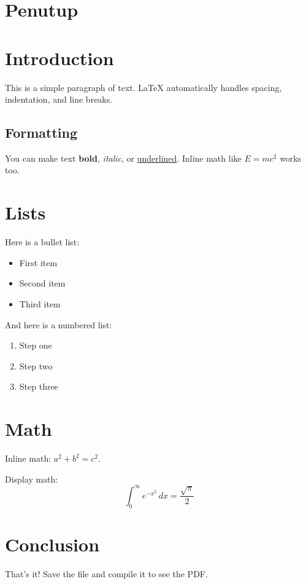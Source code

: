 \documentclass[12pt,a4paper]{report}
\begin{document}
\chapter{Penutup}


\chapter{Introduction}
This is a simple paragraph of text. LaTeX automatically handles spacing, indentation, and line breaks.

\section{Formatting}
You can make text \textbf{bold}, \textit{italic}, or \underline{underlined}. Inline math like $E = mc^2$ works too.

\chapter{Lists}
Here is a bullet list:
\begin{itemize}
  \item First item
  \item Second item
  \item Third item
\end{itemize}

And here is a numbered list:
\begin{enumerate}
  \item Step one
  \item Step two
  \item Step three
\end{enumerate}

\chapter{Math}
Inline math: $a^2 + b^2 = c^2$.

Display math:
\begin{equation}
  \int_0^\infty e^{-x^2} \, dx = \frac{\sqrt{\pi}}{2}
\end{equation}

\chapter{Conclusion}
That's it! Save the file and compile it to see the PDF.
\end{document}
